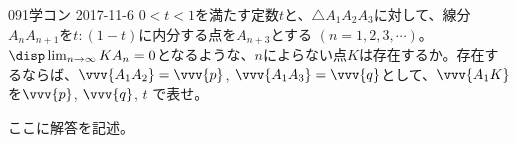 \begin{thm}{091}{}{学コン 2017-11-6}
 $0<t<1$を満たす定数$t$と、$\triangle{A_1A_2A_3}$に対して、線分$A_nA_{n+1}$を$t:(1-t)$に内分する点を$A_{n+3}$とする $(n=1, 2, 3, \cdots)$。$\disp \lim_{n\to\infty}KA_n=0$となるような、$n$によらない点$K$は存在するか。存在するならば、$\vvv{A_1A_2}=\vvv{p}$, $\vvv{A_1A_3}=\vvv{q}$として、$\vvv{A_1K}$を$\vvv{p}$, $\vvv{q}$, $t$ で表せ。
\end{thm}

ここに解答を記述。